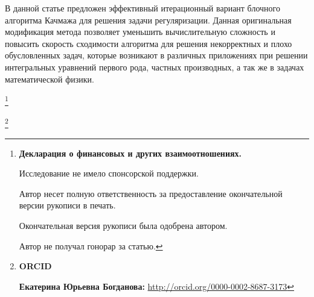 \smallskip




В данной статье предложен эффективный итерационный вариант блочного алгоритма Качмажа для решения задачи регуляризации. Данная оригинальная модификация метода позволяет уменьшить вычислительную сложность и повысить скорость сходимости алгоритма для решения некорректных и плохо обусловленных задач, которые возникают в различных приложениях при решении интегральных уравнений первого рода, частных производных, а так же в задачах математической физики.









\thanks{{\bf Декларация о финансовых и других взаимоотношениях.}

Исследование не имело спонсорской поддержки.

Автор несет полную ответственность за предоставление окончательной версии рукописи в печать.

Окончательная версия рукописи была одобрена автором.

Автор не получал гонорар за статью.

}







\thanks{{\bf ORCID}



{\bf  Екатерина Юрьевна Богданова:}    \url{http://orcid.org/0000-0002-8687-3173}



}



\RusRef

